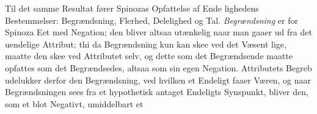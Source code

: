 \documentclass[12pt,a4paper]{book}
\begin{document}
Til det samme Resultat fører Spinozas Opfattelse af Ende\-%
lighedens Bestemmelser: Begrændsning, Flerhed, Delelighed og
Tal. \emph{Begrændsning} er for Spinoza Eet med Negation; den
bliver altsaa utænkelig naar man gaaer ud fra det uendelige
Attribut; thi da Begrændsning kun kan skee ved det Væsent\-%
%
%
%
lige, maatte den skee ved Attributet selv, og dette som det
Begrændsende maatte opfattes som det Begrændsedes, altsaa
som sin egen Negation. Attributets Begreb udelukker derfor
den Begrændsning, ved hvilken et Endeligt faaer Væren, og
naar Begrændsningen sees fra et hypothetisk antaget Endeligts
Synspunkt, bliver den, som et blot Negativt, umiddelbart et
\end{document}
